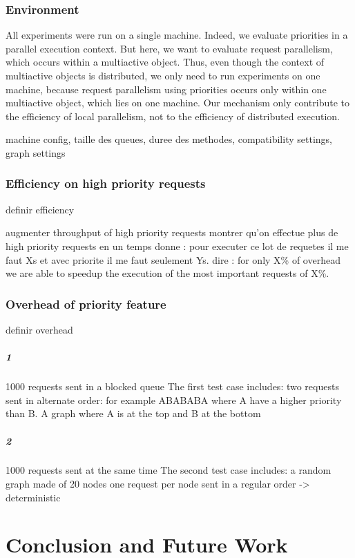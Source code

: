 \documentclass[11pt]{report}
\begin{document}
\subsection{Environment}
All experiments were run on a single machine. Indeed, we evaluate priorities in a parallel execution context. But here, we want to evaluate request parallelism, which occurs within a multiactive object. Thus, even though the context of multiactive objects is distributed, we only need to run experiments on one machine, because request parallelism using priorities occurs only within one multiactive object, which lies on one machine. Our mechanism only contribute to the efficiency of local parallelism, not to the efficiency of distributed execution.

machine config,
taille des queues,
duree des methodes,
compatibility settings,
graph settings

\subsection{Efficiency on high priority requests}
definir efficiency 

augmenter throughput of high priority requests
montrer qu'on effectue plus de high priority requests en un temps donne : pour executer ce lot de requetes il me faut Xs et avec priorite il me faut seulement Ys.
dire : for only X\% of overhead we are able to speedup the execution of the most important requests of X\%. 
\subsection{Overhead of priority feature}
definir overhead
\paragraph{1}
1000 requests sent in a blocked queue
The first test case includes: 
two requests sent in alternate order: for example ABABABA where A have a higher priority than B.
A graph where A is at the top and B at the bottom
\paragraph{2}
1000 requests sent at the same time
The second test case includes:
a random graph made of 20 nodes
one request per node sent in a regular order -> deterministic


\chapter{Conclusion and Future Work} 
\end{document}
